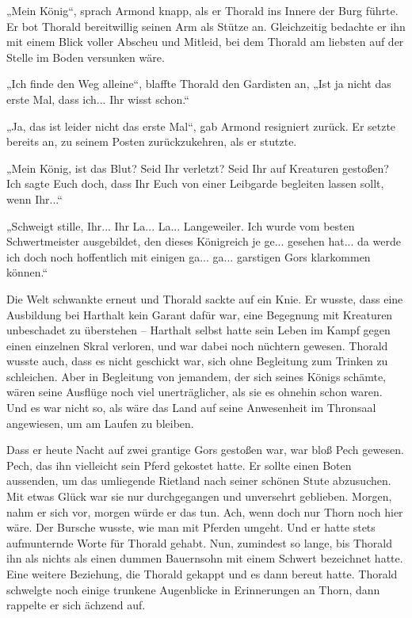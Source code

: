 „Mein König“, sprach Armond knapp, als er Thorald ins Innere der Burg führte. Er bot Thorald bereitwillig seinen Arm als Stütze an. Gleichzeitig bedachte er ihn mit einem Blick voller Abscheu und Mitleid, bei dem Thorald am liebsten auf der Stelle im Boden versunken wäre.

„Ich finde den Weg alleine“, blaffte Thorald den Gardisten an, „Ist ja nicht das erste Mal, dass ich... Ihr wisst schon.“

„Ja, das ist leider nicht das erste Mal“, gab Armond resigniert zurück. Er setzte bereits an, zu seinem Posten zurückzukehren, als er stutzte.

„Mein König, ist das Blut? Seid Ihr verletzt? Seid Ihr auf Kreaturen gestoßen? Ich sagte Euch doch, dass Ihr Euch von einer Leibgarde begleiten lassen sollt, wenn Ihr...“

„Schweigt stille, Ihr... Ihr La... La... Langeweiler. Ich wurde vom besten Schwertmeister ausgebildet, den dieses Königreich je ge... gesehen hat... da werde ich doch noch hoffentlich mit einigen ga... ga... garstigen Gors klarkommen können.“

Die Welt schwankte erneut und Thorald sackte auf ein Knie. Er wusste, dass eine Ausbildung bei Harthalt kein Garant dafür war, eine Begegnung mit Kreaturen unbeschadet zu überstehen – Harthalt selbst hatte sein Leben im Kampf gegen einen einzelnen Skral verloren, und war dabei noch nüchtern gewesen. Thorald wusste auch, dass es nicht geschickt war, sich ohne Begleitung zum Trinken zu schleichen. Aber in Begleitung von jemandem, der sich seines Königs schämte, wären seine Ausflüge noch viel unerträglicher, als sie es ohnehin schon waren. Und es war nicht so, als wäre das Land auf seine Anwesenheit im Thronsaal angewiesen, um am Laufen zu bleiben.

Dass er heute Nacht auf zwei grantige Gors gestoßen war, war bloß Pech gewesen. Pech, das ihn vielleicht sein Pferd gekostet hatte. Er sollte einen Boten aussenden, um das umliegende Rietland nach seiner schönen Stute abzusuchen. Mit etwas Glück war sie nur durchgegangen und unversehrt geblieben. Morgen, nahm er sich vor, morgen würde er das tun. Ach, wenn doch nur Thorn noch hier wäre. Der Bursche wusste, wie man mit Pferden umgeht. Und er hatte stets aufmunternde Worte für Thorald gehabt. Nun, zumindest so lange, bis Thorald ihn als nichts als einen dummen Bauernsohn mit einem Schwert bezeichnet hatte. Eine weitere Beziehung, die Thorald gekappt und es dann bereut hatte. Thorald schwelgte noch einige trunkene Augenblicke in Erinnerungen an Thorn, dann rappelte er sich ächzend auf.

